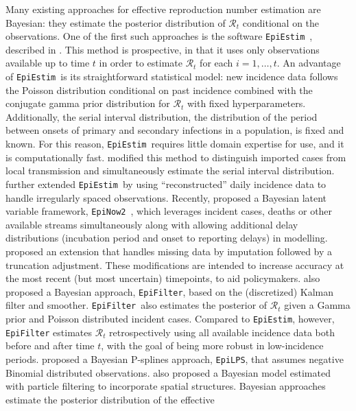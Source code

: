 \documentclass[10pt,letterpaper]{article}
\def\EpiEstim{\texttt{EpiEstim}}
\def\EpiLPS{\texttt{EpiLPS}}
\def\EpiFilter{\texttt{EpiFilter}}
\def\EpiNow2{\texttt{EpiNow2}}
\def\calR{\mathcal{R}}
\newcommand{\citep}[1]{\cite{#1}}
\begin{document}
Many existing approaches for effective reproduction number estimation are
Bayesian: they estimate the posterior distribution of $\calR_t$ conditional on
the observations. One of the first such approaches is the software \EpiEstim\
\citep{cori2020package}, described in \cite{cori2013new}. This method is
prospective, in that it uses only observations available up to time $t$ in order
to estimate $\calR_t$ for each $i = 1,\ldots, t$. An advantage of \EpiEstim\ is
its straightforward statistical model: new incidence data follows the Poisson
distribution conditional on past incidence combined with the conjugate gamma
prior distribution for $\calR_t$ with fixed hyperparameters. Additionally, the
serial interval distribution, the distribution of the period between onsets of
primary and secondary infections in a population, is fixed and known. For this
reason, \EpiEstim\ requires little domain expertise for use, and it is
computationally fast. \cite{thompson2019improved} modified this method to
distinguish imported cases from local transmission and simultaneously estimate
the serial interval distribution. \cite{nash2023estimating} further extended
\EpiEstim\ by using ``reconstructed'' daily incidence data to handle irregularly
spaced observations. Recently, \cite{abbott2020estimating} proposed a Bayesian
latent variable framework, \EpiNow2\ \citep{EpiNow2}, which leverages
incident cases, deaths or other available streams simultaneously along with
allowing additional delay distributions (incubation period and onset to
reporting delays) in modelling.  
\cite{lison2023generative} proposed an extension that handles missing data by
imputation followed by a truncation adjustment. These modifications are intended
to increase accuracy at the most recent (but most uncertain) timepoints, to aid 
policymakers. \cite{parag2021improved} also proposed a Bayesian approach, 
\EpiFilter, based on the (discretized) Kalman filter and smoother. 
\EpiFilter\ also estimates the posterior of $\calR_t$ given a Gamma 
prior and Poisson distributed incident cases. Compared to \EpiEstim, 
however, \texttt{EpiFilter} estimates $\calR_t$ retrospectively using all 
available incidence data both before and after time $t$, with the goal of being 
more robust in low-incidence periods. \cite{gressani2022epilps} proposed a 
Bayesian P-splines approach, \EpiLPS, that assumes negative Binomial distributed 
observations. \cite{trevisin2023spatially} also proposed a Bayesian model estimated 
with particle filtering to incorporate spatial structures. 
Bayesian approaches estimate the posterior distribution of the effective
\end{document}
